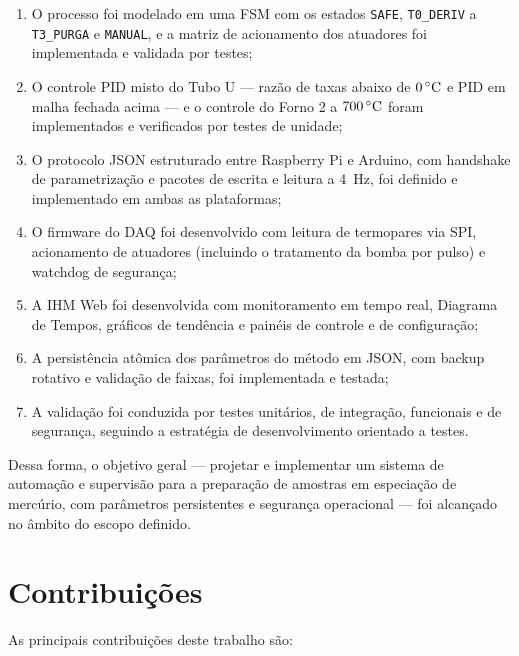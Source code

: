 \begin{enumerate}[label=\arabic*)]
  \item O processo foi modelado em uma FSM com os estados \texttt{SAFE},
  \texttt{T0\_DERIV} a \texttt{T3\_PURGA} e \texttt{MANUAL}, e a matriz de
  acionamento dos atuadores foi implementada e validada por testes;
  \item O controle PID misto do Tubo U --- razão de taxas abaixo de
  $0\,\celsius$ e PID em malha fechada acima --- e o controle do Forno 2 a
  $700\,\celsius$ foram implementados e verificados por testes de unidade;
  \item O protocolo JSON estruturado entre Raspberry Pi e Arduino, com handshake
  de parametrização e pacotes de escrita e leitura a 4~Hz, foi definido e
  implementado em ambas as plataformas;
  \item O firmware do DAQ foi desenvolvido com leitura de termopares via SPI,
  acionamento de atuadores (incluindo o tratamento da bomba por pulso) e
  watchdog de segurança;
  \item A IHM Web foi desenvolvida com monitoramento em tempo real, Diagrama de
  Tempos, gráficos de tendência e painéis de controle e de configuração;
  \item A persistência atômica dos parâmetros do método em JSON, com backup
  rotativo e validação de faixas, foi implementada e testada;
  \item A validação foi conduzida por testes unitários, de integração,
  funcionais e de segurança, seguindo a estratégia de desenvolvimento orientado
  a testes.
\end{enumerate}

Dessa forma, o objetivo geral --- projetar e implementar um sistema de automação
e supervisão para a preparação de amostras em especiação de mercúrio, com
parâmetros persistentes e segurança operacional --- foi alcançado no âmbito do
escopo definido.

\section{Contribuições}

As principais contribuições deste trabalho são:

